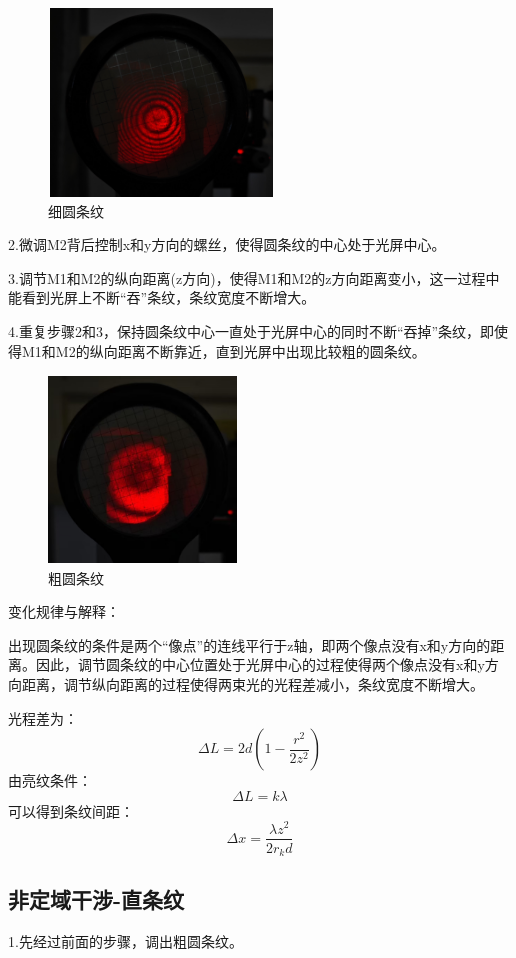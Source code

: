 \documentclass[a4paper, 10pt]{article}
\begin{document}
\begin{figure}[h]
  \centering 
  \includegraphics[height=5.0cm,width=6.0cm]{p2.png}
  
  \caption{细圆条纹}
  \label{3}
  
  \end{figure}
  
\noindent 2.微调M2背后控制x和y方向的螺丝，使得圆条纹的中心处于光屏中心。


\noindent 3.调节M1和M2的纵向距离(z方向)，使得M1和M2的z方向距离变小，这一过程中能看到光屏上不断“吞”条纹，条纹宽度不断增大。


\noindent 4.重复步骤2和3，保持圆条纹中心一直处于光屏中心的同时不断“吞掉”条纹，即使得M1和M2的纵向距离不断靠近，直到光屏中出现比较粗的圆条纹。
\begin{figure}[h]
  \centering 
  \includegraphics[height=5.0cm,width=5.0cm]{p3.jpg}
  
  \caption{粗圆条纹}
  \label{4}
  
  \end{figure}


\noindent 变化规律与解释：


\noindent 出现圆条纹的条件是两个“像点”的连线平行于z轴，即两个像点没有x和y方向的距离。因此，调节圆条纹的中心位置处于光屏中心的过程使得两个像点没有x和y方向距离，调节纵向距离的过程使得两束光的光程差减小，条纹宽度不断增大。

\noindent 光程差为：
$$\Delta L=2d(1-\frac{r^2}{2z^2})$$
由亮纹条件：
$$\Delta L=k\lambda$$
可以得到条纹间距：
$$\Delta x=\frac{\lambda z^2}{2r_kd}$$
\subsection{非定域干涉-直条纹}
\noindent 1.先经过前面的步骤，调出粗圆条纹。
\end{document}
